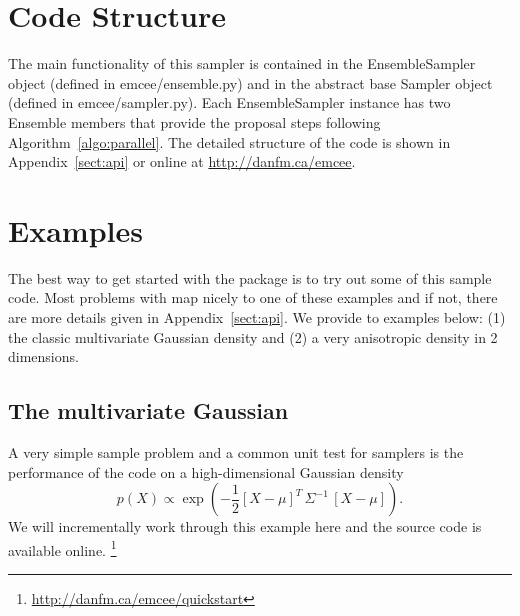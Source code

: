 \documentclass[12pt,preprint]{aastex}
\newcommand{\code}[1]{{\sffamily #1}}
\newcommand{\eqlabel}[1]{\label{eq:#1}}
\newcommand{\App}[1]{Appendix~\ref{sect:#1}}
\newcommand{\app}[1]{\App{#1}}
\newcommand{\Algo}[1]{Algorithm~\ref{algo:#1}}
\newcommand{\algo}[1]{\Algo{#1}}
\renewcommand{\vector}[1]{#1}
\newcommand{\pr}[1]{\ensuremath{p(#1)}}
\begin{document}
\section{Code Structure}

The main functionality of this sampler is contained in the
\code{EnsembleSampler} object (defined in \code{emcee/ensemble.py}) and
in the abstract base \code{Sampler} object (defined in
\code{emcee/sampler.py}). Each \code{EnsembleSampler} instance has two
\code{Ensemble} members that provide the proposal steps following
\algo{parallel}. The detailed structure of the code is shown in
\app{api} or online at \url{http://danfm.ca/emcee}.

\section{Examples}

The best way to get started with the package is to try out some of this
sample code. Most problems with map nicely to one of these examples and
if not, there are more details given in \app{api}. We provide to examples
below: (1) the classic multivariate Gaussian density and (2) a very
anisotropic density in 2 dimensions.

\subsection{The multivariate Gaussian}

A very simple sample problem and a common unit test for samplers is
the performance of the code on a high-dimensional Gaussian density
\begin{equation}\eqlabel{mgauss}
    \pr{\vector{X}} \propto \exp\left ( -\frac{1}{2} [\vector{X} - \mu]^T \,
                                \Sigma^{-1} \, [\vector{X} - \mu] \right ).
\end{equation}
We will incrementally work through this example here and the source code
is available online.%
\footnote{\url{http://danfm.ca/emcee/quickstart}}
\end{document}
